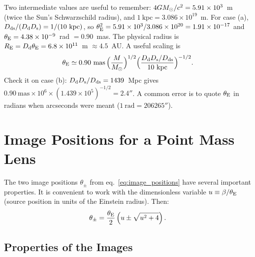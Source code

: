 \begin{annotation}
Two intermediate values are useful to remember: $4GM_{\odot}/c^2 = 5.91\times10^{3}$~m
(twice the Sun's Schwarzschild radius), and $1~\mathrm{kpc} = 3.086\times10^{19}$~m.
For case (a), $D_{\mathrm{ds}}/(D_{\mathrm{d}}D_{\mathrm{s}}) = 1/(10~\mathrm{kpc})$, so
$\theta_{\mathrm{E}}^2 = 5.91\times10^{3}/3.086\times10^{20} = 1.91\times10^{-17}$ and
$\theta_{\mathrm{E}} = 4.38\times10^{-9}$~rad $= 0.90$~mas. The physical radius is
$R_{\mathrm{E}} = D_{\mathrm{d}}\theta_{\mathrm{E}} = 6.8\times10^{11}$~m $\approx 4.5$~AU. A useful scaling is
\begin{equation*}
    \theta_{\mathrm{E}} \simeq 0.90~\mathrm{mas}\,
    \Big(\frac{M}{M_{\odot}}\Big)^{1/2}
    \Big(\frac{D_{\mathrm{d}}D_{\mathrm{s}}/D_{\mathrm{ds}}}{10~\mathrm{kpc}}\Big)^{-1/2}.
\end{equation*}
Check it on case (b): $D_{\mathrm{d}}D_{\mathrm{s}}/D_{\mathrm{ds}} = 1439$~Mpc gives
$0.90~\mathrm{mas}\times10^{6}\times(1.439\times10^{5})^{-1/2} = 2.4''$.
A common error is to quote $\theta_{\mathrm{E}}$ in radians when arcseconds were
meant ($1~\mathrm{rad} = 206265''$).
\end{annotation}


\section{Image Positions for a Point Mass Lens}
\label{sec:image_positions}

The two image positions $\theta_\pm$ from eq.~\eqref{eq:image_positions}
have several important properties.  It is convenient to work with the
dimensionless variable $u \equiv \beta / \theta_{\mathrm{E}}$ (source position in
units of the Einstein radius).  Then:
\begin{equation}
    \theta_\pm = \frac{\theta_{\mathrm{E}}}{2}\left(u \pm \sqrt{u^2 + 4}\right) .
    \label{eq:images_dimensionless}
\end{equation}

\subsection{Properties of the Images}

